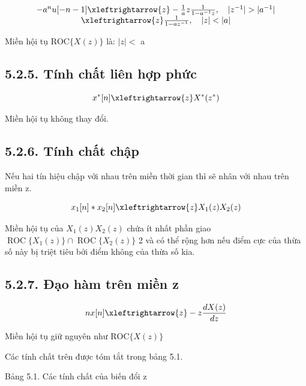 \documentclass[
  10
]{article}
\begin{document}
\[
\begin{array}{c} - a ^ {n} u [ - n - 1 ] \xleftrightarrow {z} - \frac {1}{a} z \frac {1}{1 - a ^ {- 1} z}, \quad | z ^ {- 1} | > | a ^ {- 1} | \\ \xleftrightarrow {z} \frac {1}{1 - a z ^ {- 1}}, \quad | z | <   | a | \end{array}
\]

Miền hội tụ \(\mathrm { R O C } \{ X ( z ) \}\) là: \(| z | <\)
\textbar{}a\textbar{}

\subsection{5.2.5. Tính chất liên hợp
phức}\label{tuxednh-chux1ea5t-liuxean-hux1ee3p-phux1ee9c}

\[
x ^ {*} [ n ] \xleftrightarrow {z} X ^ {*} (z ^ {*})
\]

Miền hội tụ không thay đổi.

\subsection{5.2.6. Tính chất chập}\label{tuxednh-chux1ea5t-chux1eadp}

Nếu hai tín hiệu chập với nhau trên miền thời gian thì sẽ nhân với nhau
trên miền z.

\[
x _ {1} [ n ] * x _ {2} [ n ] \xleftrightarrow {z} X _ {1} (z) X _ {2} (z)
\]

Miền hội tụ của \(X _ { 1 } ( z ) X _ { 2 } ( z )\) chứa ít nhất phần
giao
\(\operatorname { R O C } \{ X _ { 1 } ( z ) \} \cap \operatorname { R O C } \{ X _ { 2 } ( z ) \}\)
2 và có thể rộng hơn nếu điểm cực của thừa số này bị triệt tiêu bởi điểm
không của thừa số kia.

\subsection{5.2.7. Đạo hàm trên miền
z}\label{ux111ux1ea1o-huxe0m-truxean-miux1ec1n-z}

\[
n x [ n ] \xleftrightarrow {z} - z \frac {d X (z)}{d z}
\]

Miền hội tụ giữ nguyên như \(\mathrm { R O C } \{ X ( z ) \}\)

Các tính chất trên được tóm tắt trong bảng 5.1.

Bảng 5.1. Các tính chất của biến đổi z
\end{document}
